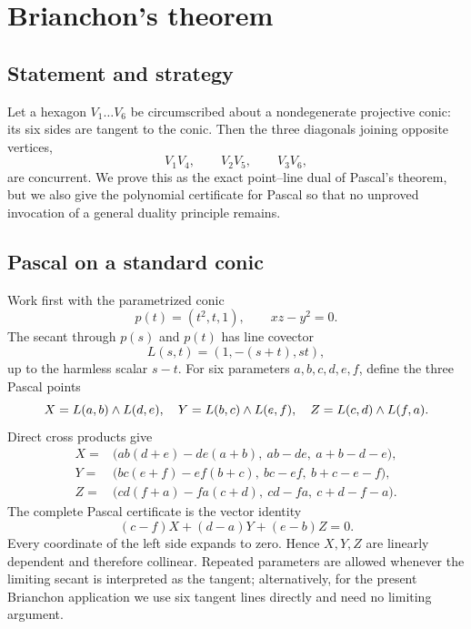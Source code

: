\section{Brianchon's theorem}

\subsection{Statement and strategy}

Let a hexagon $V_1\ldots V_6$ be circumscribed about a nondegenerate projective
conic: its six sides are tangent to the conic.  Then the three diagonals
joining opposite vertices,
\[
 V_1V_4,\qquad V_2V_5,\qquad V_3V_6,
\]
are concurrent.  We prove this as the exact point--line dual of Pascal's
theorem, but we also give the polynomial certificate for Pascal so that no
unproved invocation of a general duality principle remains.

\subsection{Pascal on a standard conic}

Work first with the parametrized conic
\[
 p(t)=(t^2,t,1),
 \qquad xz-y^2=0.
\]
The secant through $p(s)$ and $p(t)$ has line covector
\begin{equation}\label{eq:secant-line}
 L(s,t)=(1,-(s+t),st),
\end{equation}
up to the harmless scalar $s-t$.  For six parameters $a,b,c,d,e,f$, define
the three Pascal points
\[
 X=L(a,b)\mathbin{\wedge} L(d,e),
 \quad Y=L(b,c)\mathbin{\wedge} L(e,f),
 \quad Z=L(c,d)\mathbin{\wedge} L(f,a).
\]
Direct cross products give
\begin{align*}
 X={}&\bigl(ab(d+e)-de(a+b),\ ab-de,\ a+b-d-e\bigr),\\
 Y={}&\bigl(bc(e+f)-ef(b+c),\ bc-ef,\ b+c-e-f\bigr),\\
 Z={}&\bigl(cd(f+a)-fa(c+d),\ cd-fa,\ c+d-f-a\bigr).
\end{align*}
The complete Pascal certificate is the vector identity
\begin{equation}\label{eq:pascal-certificate}
 (c-f)X+(d-a)Y+(e-b)Z=0.
\end{equation}
Every coordinate of the left side expands to zero.  Hence $X,Y,Z$ are
linearly dependent and therefore collinear.  Repeated parameters are allowed
whenever the limiting secant is interpreted as the tangent; alternatively,
for the present Brianchon application we use six tangent lines directly and
need no limiting argument.

